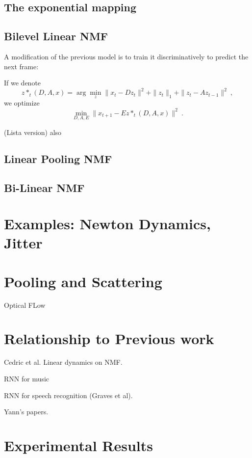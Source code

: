 \documentclass[11pt]{article} %
\begin{document}
\subsection{The exponential mapping} 


\subsection{Bilevel Linear NMF}

A modification of the previous model is to train it discriminatively to predict the next frame:

If we denote 
$$z*_t(D, A, x) = \arg \min_z \| x_t - D z_t \|^2 + \|z_t \|_1 +  \| z_t - A z_{t-1} \|^2~,$$
we optimize
$$\min_{D, A, E} \| x_{t+1} - E z*_t(D, A, x) \|^2~.$$

(Lista version) also 


\subsection{Linear Pooling NMF}

\subsection{Bi-Linear NMF}

\section{Examples: Newton Dynamics, Jitter}

\section{Pooling and Scattering}

Optical FLow

\section{Relationship to Previous work}

Cedric et al. Linear dynamics on NMF. 

RNN for music

RNN for speech recognition (Graves et al). 

Yann's papers.

\section{Experimental Results}
\end{document}
